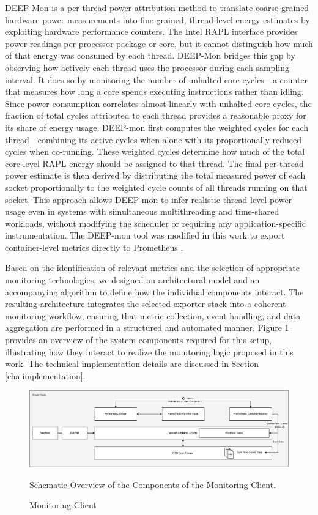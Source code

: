 DEEP-Mon is a per-thread power attribution method to translate coarse-grained hardware power measurements into fine-grained, thread-level energy estimates by exploiting hardware performance counters. The Intel RAPL interface provides power readings per processor package or core, but it cannot distinguish how much of that energy was consumed by each thread. DEEP-Mon bridges this gap by observing how actively each thread uses the processor during each sampling interval. It does so by monitoring the number of unhalted core cycles—a counter that measures how long a core spends executing instructions rather than idling. Since power consumption correlates almost linearly with unhalted core cycles, the fraction of total cycles attributed to each thread provides a reasonable proxy for its share of energy usage. DEEP-mon first computes the weighted cycles for each thread—combining its active cycles when alone with its proportionally reduced cycles when co-running. These weighted cycles determine how much of the total core-level RAPL energy should be assigned to that thread. The final per-thread power estimate is then derived by distributing the total measured power of each socket proportionally to the weighted cycle counts of all threads running on that socket. This approach allows DEEP-mon to infer realistic thread-level power usage even in systems with simultaneous multithreading and time-shared workloads, without modifying the scheduler or requiring any application-specific instrumentation. The DEEP-mon tool was modified in this work to export container-level metrics directly to Prometheus \cite{8425477}.

Based on the identification of relevant metrics and the selection of appropriate monitoring technologies, we designed an architectural model and an accompanying algorithm to define how the individual components interact. The resulting architecture integrates the selected exporter stack into a coherent monitoring workflow, ensuring that metric collection, event handling, and data aggregation are performed in a structured and automated manner. Figure \ref{fig:04-monitoring} provides an overview of the system components required for this setup, illustrating how they interact to realize the monitoring logic proposed in this work. The technical implementation details are discussed in Section \ref{cha:implementation}.

\begin{figure}[H]
    \centering
    \includegraphics[scale=0.45]{fig/04/04-monitoring.pdf}
    \small
    \caption{Monitoring Client}
    \label{fig:04-monitoring}
    \tiny
    Schematic Overview of the Components of the Monitoring Client.
\end{figure}

